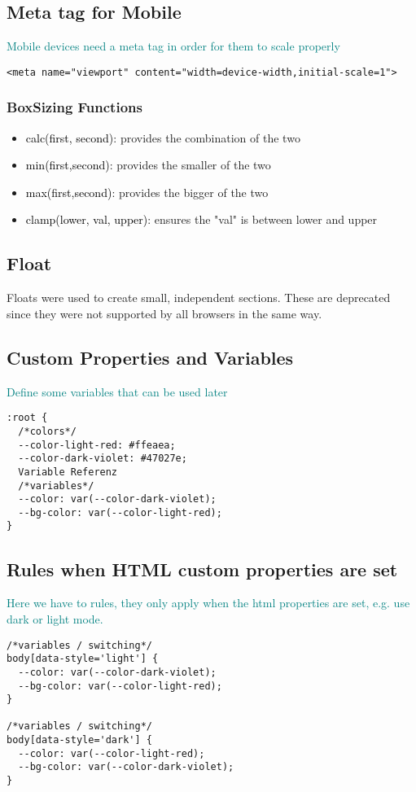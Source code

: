 \documentclass[main.tex,fontsize=8pt,paper=a4,paper=portrait,DIV=calc,]{scrartcl}
\begin{document}
\subsection{Meta tag for Mobile}
\textcolor{teal}{Mobile devices need a meta tag in order for them to scale properly}
\begin{lstlisting}
<meta name="viewport" content="width=device-width,initial-scale=1">
\end{lstlisting}

\subsubsection{BoxSizing Functions}
\begin{itemize}
\item \textcolor{black}{calc(first, second)}: provides the combination of the two
\item \textcolor{black}{min(first,second)}: provides the smaller of the two
\item \textcolor{black}{max(first,second)}: provides the bigger of the two
\item \textcolor{black}{clamp(lower, val, upper)}: ensures the "val" is between lower and upper 
\end{itemize} 


\lstset{
    language=CSS,
    style=code,
}

\subsection{Float}
Floats were used to create small, independent sections. These are deprecated since they were not supported by all browsers in the same way.

\subsection{Custom Properties and Variables}
\textcolor{teal}{Define some variables that can be used later}
\begin{lstlisting}
:root {
  /*colors*/
  --color-light-red: #ffeaea;
  --color-dark-violet: #47027e;
  Variable Referenz
  /*variables*/
  --color: var(--color-dark-violet);
  --bg-color: var(--color-light-red);
}
\end{lstlisting}

\subsection{Rules when HTML custom properties are set}
\textcolor{teal}{Here we have to rules, they only apply when the html properties are set, e.g. use dark or light mode.}
\begin{lstlisting}
/*variables / switching*/
body[data-style='light'] {
  --color: var(--color-dark-violet);
  --bg-color: var(--color-light-red);
}

/*variables / switching*/
body[data-style='dark'] {
  --color: var(--color-light-red);
  --bg-color: var(--color-dark-violet);
}
\end{lstlisting}
\end{document}
